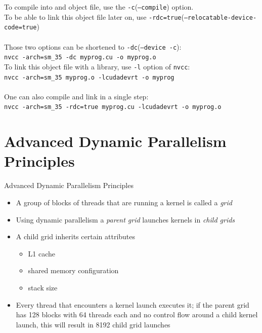 \documentclass[fleqn,11pt,aspectratio=43]{beamer}
\begin{document}
\begin{frame}
	To compile into and object file, use the \texttt{-c}(\texttt{--compile}) option.\\
	To be able to link this object file later on, use \texttt{-rdc=true}(\texttt{--relocatable-device-code=true})\\
	\\
	Those two options can be shortened to \texttt{-dc}(\texttt{--device -c}):\\
	\texttt{nvcc -arch=sm\_35 -dc myprog.cu -o myprog.o}\\
	To link this object file with a library, use \texttt{-l} option of \texttt{nvcc}:\\
	\texttt{nvcc -arch=sm\_35 myprog.o -lcudadevrt -o myprog}\\
	\\
	One can also compile and link in a single step:\\
	\texttt{nvcc -arch=sm\_35 -rdc=true myprog.cu -lcudadevrt -o myprog.o}
\end{frame}

\section{Advanced Dynamic Parallelism Principles}

\begin{frame}{Advanced Dynamic Parallelism Principles}
	\begin{itemize}
		\item A group of blocks of threads that are running a kernel is called a \textit{grid}
		\item Using dynamic parallelism a \textit{parent grid} launches kernels in \textit{child grids}
		\item A child grid inherits certain attributes
		\begin{itemize}
			\item L1 cache
			\item shared memory configuration
			\item stack size
		\end{itemize}
		\item Every thread that encounters a kernel launch executes it; if the parent grid has 128 blocks with 64 threads each and no control flow around a child kernel launch, this will result in 8192 child grid launches
	\end{itemize}
\end{frame}
\end{document}
